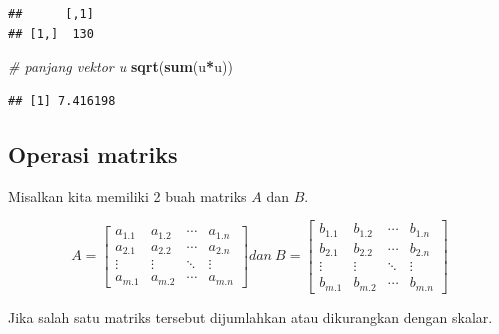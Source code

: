 \documentclass[]{book}
\newenvironment{Shaded}{\begin{snugshade}}{\end{snugshade}}
\newcommand{\CommentTok}[1]{\textcolor[rgb]{0.56,0.35,0.01}{\textit{#1}}}
\newcommand{\KeywordTok}[1]{\textcolor[rgb]{0.13,0.29,0.53}{\textbf{#1}}}
\newcommand{\NormalTok}[1]{#1}
\newcommand{\OperatorTok}[1]{\textcolor[rgb]{0.81,0.36,0.00}{\textbf{#1}}}
\theoremstyle{definition}
\theoremstyle{definition}
\theoremstyle{definition}
\theoremstyle{remark}
\begin{document}
\begin{verbatim}
##      [,1]
## [1,]  130
\end{verbatim}

\begin{Shaded}
\begin{Highlighting}[]
\CommentTok{# panjang vektor u}
\KeywordTok{sqrt}\NormalTok{(}\KeywordTok{sum}\NormalTok{(u}\OperatorTok{*}\NormalTok{u))}
\end{Highlighting}
\end{Shaded}

\begin{verbatim}
## [1] 7.416198
\end{verbatim}

\hypertarget{operasimatrik}{%
\subsection{Operasi matriks}\label{operasimatrik}}

Misalkan kita memiliki 2 buah matriks \(A\) dan \(B\).

\begin{equation}
A = \begin{bmatrix}
       a_{1.1} & a_{1.2} &\cdots& a_{1.n}           \\[0.3em]
       a_{2.1} & a_{2.2} &\cdots& a_{2.n}           \\[0.3em]
       \vdots  & \vdots  &\ddots& \vdots            \\[0.3em]
       a_{m.1} & a_{m.2} &\cdots& a_{m.n}
     \end{bmatrix}
dan\ B = \begin{bmatrix}
      b_{1.1} & b_{1.2} &\cdots& b_{1.n}           \\[0.3em]
      b_{2.1} & b_{2.2} &\cdots& b_{2.n}           \\[0.3em]
      \vdots  & \vdots  &\ddots& \vdots            \\[0.3em]
      b_{m.1} & b_{m.2} &\cdots& b_{m.n}
     \end{bmatrix}
  \label{eq:matrikuv}
\end{equation}

Jika salah satu matriks tersebut dijumlahkan atau dikurangkan dengan skalar.
\end{document}
